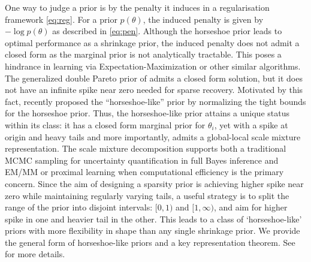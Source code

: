\documentclass[11pt]{article}
\begin{document}
One way to judge a prior is by the penalty it induces in a regularisation
framework \eqref{eq:reg}. For a prior $p(\theta)$, the induced penalty is given
by $-\log p(\theta)$ as described in \eqref{eq:pen}. Although the horseshoe
prior leads to optimal performance as a shrinkage prior, the induced penalty
does not admit a closed form as the marginal prior is not analytically
tractable. This poses a hindrance in learning via Expectation-Maximization or
other similar algorithms.  The generalized double Pareto prior of
\citet{armagan2011generalized} admits a closed form solution, but it does not
have an infinite spike near zero needed for sparse recovery. Motivated by this fact,
\citet{bhadra2017horseshoe} recently proposed the ``horseshoe-like'' prior by
normalizing the tight bounds for the horseshoe prior. Thus, the horseshoe-like
prior attains a unique status within its class: it has a closed form marginal
prior for $\theta_i$, yet with a spike at origin and heavy tails and more
importantly, admits a global-local scale mixture representation. The scale
mixture decomposition supports both a traditional MCMC sampling for uncertainty
quantification in full Bayes inference and EM/MM or proximal learning when
computational efficiency is the primary concern. Since the aim of designing a
sparsity prior is achieving higher spike near zero while maintaining regularly
varying tails, a useful strategy is to split the range of the prior into
disjoint intervals: $[0,1)$ and $[1, \infty)$, and aim for higher spike in one
and heavier tail in the other. This leads to a class of `horseshoe-like' priors
with more flexibility in shape than any single shrinkage prior. We provide the
general form of horseshoe-like priors and a key
representation theorem.  See \citet{bhadra2017horseshoe} for more details. 
\end{document}
